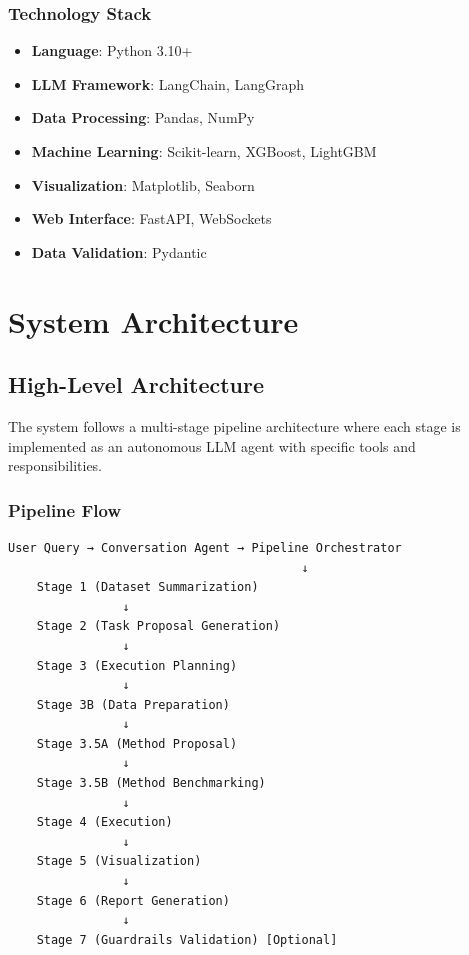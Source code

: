\documentclass[12pt,a4paper]{report}
\begin{document}
\subsection{Technology Stack}
\begin{itemize}
    \item \textbf{Language}: Python 3.10+
    \item \textbf{LLM Framework}: LangChain, LangGraph
    \item \textbf{Data Processing}: Pandas, NumPy
    \item \textbf{Machine Learning}: Scikit-learn, XGBoost, LightGBM
    \item \textbf{Visualization}: Matplotlib, Seaborn
    \item \textbf{Web Interface}: FastAPI, WebSockets
    \item \textbf{Data Validation}: Pydantic
\end{itemize}

\chapter{System Architecture}

\section{High-Level Architecture}
The system follows a multi-stage pipeline architecture where each stage is implemented as an autonomous LLM agent with specific tools and responsibilities.

\subsection{Pipeline Flow}
\begin{verbatim}
User Query → Conversation Agent → Pipeline Orchestrator
                                         ↓
    Stage 1 (Dataset Summarization)
                ↓
    Stage 2 (Task Proposal Generation)
                ↓
    Stage 3 (Execution Planning)
                ↓
    Stage 3B (Data Preparation)
                ↓
    Stage 3.5A (Method Proposal)
                ↓
    Stage 3.5B (Method Benchmarking)
                ↓
    Stage 4 (Execution)
                ↓
    Stage 5 (Visualization)
                ↓
    Stage 6 (Report Generation)
                ↓
    Stage 7 (Guardrails Validation) [Optional]
\end{verbatim}
\end{document}
